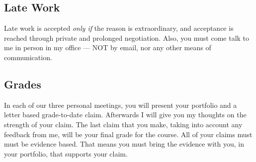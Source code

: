 \documentclass[12pt]{amsart}
\begin{document}
\subsection{Late Work} Late work is accepted \textit{only if} the reason is extraordinary, and acceptance is reached through private and prolonged negotiation. Also, you must come talk to me in person in my office --- NOT by email, nor any other means of communication.

\subsection{Grades} In each of our three personal meetings, you will present your portfolio and a letter based grade-to-date claim. Afterwards I will give you my thoughts on the strength of your claim. The last claim that you make, taking into account any feedback from me, will be your final grade for the course. All of your claims must must be evidence based. That means you must bring the evidence with you, in your portfolio, that supports your claim. 
\end{document}
